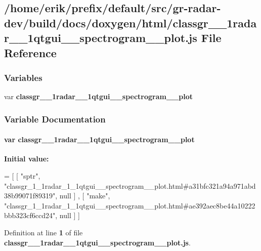 \subsection{/home/erik/prefix/default/src/gr-\/radar-\/dev/build/docs/doxygen/html/classgr\+\_\+\_\+1radar\+\_\+\_\+1qtgui\+\_\+\+\_\+spectrogram\+\_\+\+\_\+plot.js File Reference}
\label{classgr__1__1radar__1__1qtgui____spectrogram____plot_8js}
\subsubsection*{Variables}
\begin{DoxyCompactItemize}
\item 
var {\bf classgr\+\_\+\_\+1radar\+\_\+\_\+1qtgui\+\_\+\+\_\+spectrogram\+\_\+\+\_\+plot}
\end{DoxyCompactItemize}


\subsubsection{Variable Documentation}
\paragraph[{classgr\+\_\+1\+\_\+1radar\+\_\+1\+\_\+1qtgui\+\_\+\+\_\+spectrogram\+\_\+\+\_\+plot}]{\setlength{\rightskip}{0pt plus 5cm}var classgr\+\_\+\_\+1radar\+\_\+\_\+1qtgui\+\_\+\+\_\+spectrogram\+\_\+\+\_\+plot}\label{classgr__1__1radar__1__1qtgui____spectrogram____plot_8js_aeb3b99cbfcac080338c896ba46141d8d}
{\bfseries Initial value\+:}
\begin{DoxyCode}
=
[
    [ \textcolor{stringliteral}{"sptr"}, \textcolor{stringliteral}{"classgr\_1\_1radar\_1\_1qtgui\_\_spectrogram\_\_plot.html#a31bfc321a94a971abd38b99071f89319"}, null ]
      ,
    [ \textcolor{stringliteral}{"make"}, \textcolor{stringliteral}{"classgr\_1\_1radar\_1\_1qtgui\_\_spectrogram\_\_plot.html#ae392aec8be44a10222bbb323cf6ccd24"}, null ]
]
\end{DoxyCode}


Definition at line {\bf 1} of file {\bf classgr\+\_\+\_\+1radar\+\_\+\_\+1qtgui\+\_\+\+\_\+spectrogram\+\_\+\+\_\+plot.\+js}.

